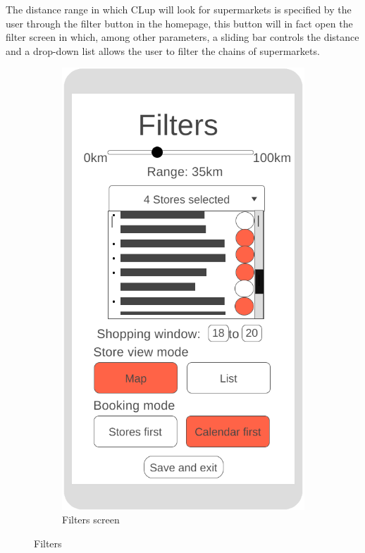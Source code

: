 The distance range in which CLup will look for supermarkets is specified by the user through the filter button in the homepage, this button will in fact open the filter screen in which, among other parameters, a sliding bar controls the distance and a drop-down list allows the user to filter the chains of supermarkets.\newline
\begin{figure}[h!]
	\centering
	\begin{subfigure}[b]{0.3\textwidth}
		\includegraphics[width=\linewidth]{../Diagrams/WireframesCLup/Filters.png}
		\caption{Filters screen}
		\label{fig:WfFilters}
	\end{subfigure}
	\caption{Filters}
	\label{fig:Wireframes}
\end{figure}
